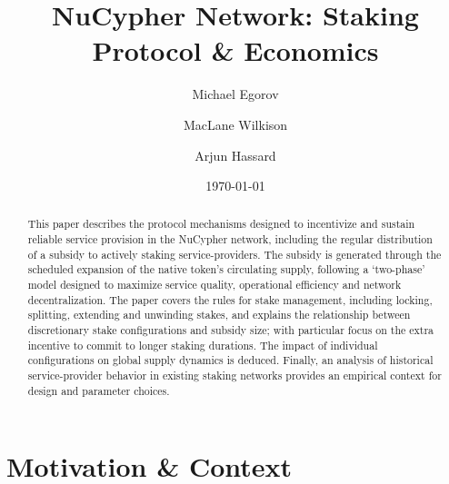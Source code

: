 \documentclass[longbibliography,nofootinbib]{revtex4-1}
\begin{document}
\title{NuCypher Network: Staking Protocol \& Economics}

\author{Michael Egorov}
\author{MacLane Wilkison}
\author{Arjun Hassard}

\begin{abstract}
This paper describes the protocol mechanisms designed to incentivize and sustain reliable service provision in the NuCypher network, including the regular distribution of a subsidy to actively staking service-providers. The subsidy is generated through the scheduled expansion of the native token's circulating supply, following a `two-phase' model designed to maximize service quality, operational efficiency and network decentralization. The paper covers the rules for stake management, including locking, splitting, extending and unwinding stakes, and explains the relationship between discretionary stake configurations and subsidy size; with particular focus on the extra incentive to commit to longer staking durations. The impact of individual configurations on global supply dynamics is deduced. Finally, an analysis of historical service-provider behavior in existing staking networks provides an empirical context for design and parameter choices.
\end{abstract}

\date{\today}
\maketitle

\section{Motivation \& Context}
\end{document}
